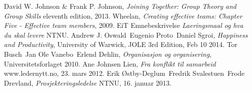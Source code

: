 \begin{thebibliography}{99}	%
		David W. Johnson \& Frank P. Johnson,
		\emph{Joining Together: Group Theory and Group Skills}
		eleventh edition,
		2013.
		Wheelan,
		\emph{Creating effective teams: Chapter Five - Effective team members},
		2009.
		EiT Emnebeskrivelse
		\emph{Laeringsmaal og hva du skal levere}
		NTNU.
		Andrew J. Oswald\, Eugenio Proto\, Daniel Sgroi,
		\emph{Happiness and Productivity},
		University of Warwick,
		JOLE 3rd Edition, Feb 10 2014.
		Tor Busch\, Jan Ole Vanebo\, Erlend Dehlin,
		\emph{Organisasjon og organisering},
		Universitetsforlaget 2010.
		Ane Johnsen Lien,
		\emph{Fra konflikt til samarbeid}
		www.ledernytt.no,
		23. mars 2012.
		Erik Østby-Deglum\, Fredrik Svalestuen\, Frode Drevland,
		\emph{Prosjekteringsledelse}
		NTNU,
		16. januar 2013.
\end{thebibliography}
